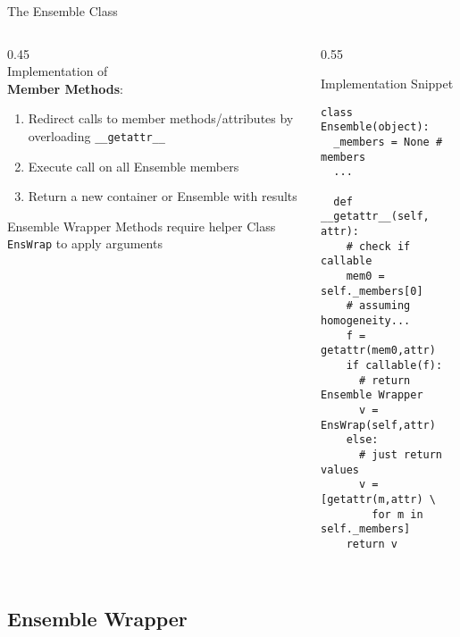 \documentclass[hyperref={pdfpagelabels=false},compress,final]{beamer}
\newenvironment{myBox}[3][shadow=true]%
{\begin{center} \begin{minipage}{#2} \begin{beamerboxesrounded}[#1]{#3} \smallskip}%
      {\smallskip \end{beamerboxesrounded} \end{minipage} \end{center}}
\newenvironment{myRedBox}[3][upper=upred,lower=lowred,shadow=true]%
{\begin{center} \begin{minipage}{#2} \begin{beamerboxesrounded}[#1]{#3} \smallskip}%
      {\smallskip \end{beamerboxesrounded} \end{minipage} \end{center}}
\begin{document}
\begin{frame}[fragile=singleslide]{The Ensemble Class}
  \begin{columns}
    \begin{column}{0.45\textwidth}
      \medskip \\
      { \large Implementation of \\ \smallskip \textbf{\color{darkred} Member Methods}:} \\ 
      \small
      \begin{enumerate}
        \item Redirect calls to member methods/attributes by overloading \texttt{\_\_getattr\_\_} \medskip
        \item Execute call on all Ensemble members \medskip
        \item Return a new container or Ensemble with results
      \end{enumerate}
      \begin{myRedBox}{1.\textwidth}{Ensemble Wrapper}
        Methods require helper Class \texttt{EnsWrap} to apply arguments
       \end{myRedBox}
    \end{column}
    \begin{column}{0.55\textwidth}
      \vspace*{-1.cm}
      \begin{myBox}{1.\textwidth}{Implementation Snippet}
        \small
        \begin{verbatim}
class Ensemble(object):
  _members = None # members
  ...
  
  def __getattr__(self, attr):
    # check if callable
    mem0 = self._members[0] 
    # assuming homogeneity...
    f = getattr(mem0,attr)
    if callable(f):
      # return Ensemble Wrapper
      v = EnsWrap(self,attr)
    else:
      # just return values
      v = [getattr(m,attr) \
        for m in self._members]
    return v
    
        \end{verbatim}
      \end{myBox}
    \end{column}
  \end{columns}
\end{frame}


\subsection*{Ensemble Wrapper}
\end{document}
